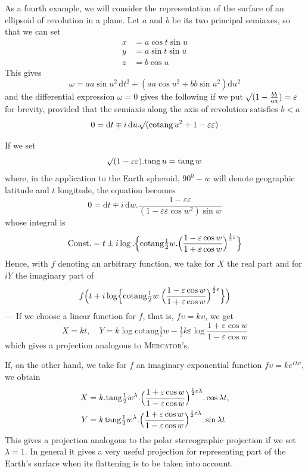 As a fourth example, we will consider the representation of the surface of an ellipsoid of revolution in a plane. Let \(a\) and \(b\) be its two principal semiaxes, so that we can set
\[
\begin{aligned}
x&=a\cos t\sin u\\
y&=a\sin t\sin u\\
z&=b\cos u
\end{aligned}
\]
%
\noindent This gives
\[
\omega=aa\sin u^2\,\mathrm{d}t^2+(aa\cos u^2+bb\sin u^2)\mathrm{d}u^2
\]
\noindent and the differential expression \(\omega=0\) gives the following if we put \(\mathord{{}^{}\!\surd}(1-\frac{bb}{aa})=\varepsilon\) for brevity, provided that the semiaxis along the axis of revolution satisfies \(b<a\)
\[
0=\mathrm{d}t\mp i\,\mathrm{d}u\mathord{.}\mathord{{}^{}\!\surd}(\mathrm{cotang}\,u^2+1-\varepsilon\varepsilon)
\]

If we set
\[
\mathord{{}^{}\!\surd}(1-\varepsilon\varepsilon)\mathord{.}\mathrm{tang}\,u=\mathrm{tang}\,w
\]
\noindent where, in the application to the Earth spheroid, \(90^0-w\) will denote geographic latitude and \(t\) longitude, the equation becomes
\[
0=\mathrm{d}t\mp i\,\mathrm{d}w\mathord{.}\frac{1-\varepsilon\varepsilon}{(1-\varepsilon\varepsilon\cos w^2)\sin w}
\]
\noindent whose integral is
\[
\text{Const.}=t\pm i\log\mathord{.}\Bigl\{\mathrm{cotang}\tfrac{1}{2}w\mathord{.}\Bigl(\frac{1-\varepsilon\cos w}{1+\varepsilon\cos w}\Bigr)^{\frac{1}{2}\varepsilon}\Bigr\}
\]
\noindent Hence, with \(f\) denoting an arbitrary function, we take for \(X\) the real part and for \(iY\) the imaginary part of
\[
f\Bigl(t+i\log\Bigl\{\mathrm{cotang}\tfrac{1}{2}w\mathord{.}\Bigl(\frac{1-\varepsilon\cos w}{1+\varepsilon\cos w}\Bigr)^{\frac{1}{2}\varepsilon}\Bigr\}\Bigr)
\]
\noindent --- If we choose a linear function for \(f\), that is, \(f\upsilon=k\upsilon\), we get
\[
X=kt,\quad Y=k\log\mathrm{cotang}\tfrac{1}{2}w-\tfrac{1}{2}k\varepsilon\log\frac{1+\varepsilon\cos w}{1-\varepsilon\cos w}
\]
\noindent which gives a projection analogous to \textsc{Mercator}'s.

If, on the other hand, we take for \(f\) an imaginary exponential function \(f\upsilon=ke^{i\lambda\upsilon}\), we obtain
\[
\begin{aligned}
X&=k\mathord{.}\mathrm{tang}\tfrac{1}{2}w^{\lambda}\mathord{.}\Bigl(\frac{1+\varepsilon\cos w}{1-\varepsilon\cos w}\Bigr)^{\frac{1}{2}\varepsilon\lambda}\mathord{.}\cos\lambda t,\\
Y&=k\,\mathrm{tang}\tfrac{1}{2}w^{\lambda}\mathord{.}\Bigl(\frac{1+\varepsilon\cos w}{1-\varepsilon\cos w}\Bigr)^{\frac{1}{2}\varepsilon\lambda}\mathord{.}\sin\lambda t
\end{aligned}
\]
\noindent This gives a projection analogous to the polar stereographic projection if we set \(\lambda=1\). In general it gives a very useful projection for representing part of the Earth’s surface when its flattening is to be taken into account.

